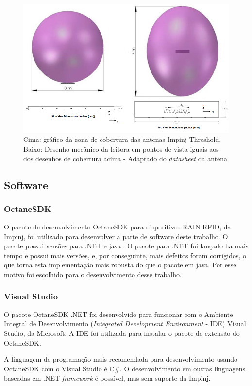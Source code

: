   \begin{figure}[H]
    \centering
    \includegraphics[width=0.6\linewidth]{figs/Metodologia/impinj_antenna_coverage.png}
    \caption{Cima: gráfico da zona de cobertura das antenas Impinj Threshold. Baixo: Desenho mecânico da leitora em pontos de vista iguais aos dos desenhos de cobertura acima - Adaptado do \textit{datasheet} da antena \cite{AntenaThresholdDatasheet}}
    \label{fig:AntenaThresholdCobertura}
\end{figure}
 
 \subsection{Software}
 
 \subsubsection{OctaneSDK}
 
 O pacote de desenvolvimento OctaneSDK para dispositivos RAIN RFID, da Impinj, foi utilizado para desenvolver a parte de software deste trabalho. O pacote possui versões para .NET e java \cite{OctaneSDK}. O pacote para .NET foi lançado ha mais tempo e possui mais versões, e, por conseguinte, mais defeitos foram corrigidos, o que torna esta implementação mais robusta do que o pacote em java. Por esse motivo foi escolhido para o desenvolvimento desse trabalho.
 
 \subsubsection{Visual Studio}
 
 O pacote OctaneSDK .NET foi desenvolvido para funcionar com o Ambiente Integral de Desenvolvimento (\textit{Integrated Development Environment} - IDE) Visual Studio, da Microsoft. A IDE foi utilizada para instalar o pacote de extensão do OctaneSDK. \cite{OctaneSDK}
 
 A linguagem de programação mais recomendada para desenvolvimento usando OctaneSDK com o Visual Studio é C\#. O desenvolvimento em outras linguagens baseadas em .NET \textit{framework} é possível, mas sem suporte da Impinj.

